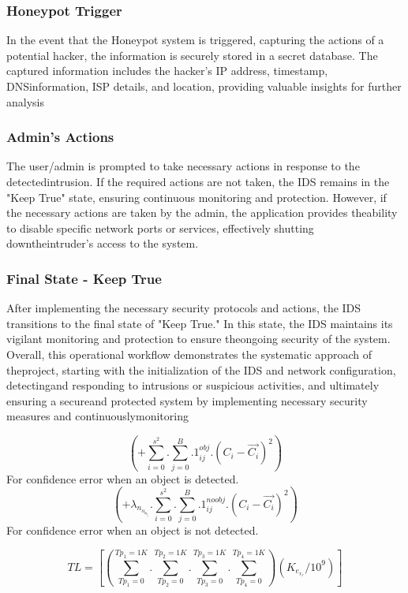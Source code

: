 \documentclass[letterpaper, 10 pt, conference]{ieeeconf}  %
\begin{document}
\subsubsection{Honeypot Trigger}
In the event that the Honeypot system is triggered, capturing the actions of a potential
hacker, the information is securely stored in a secret database. The captured information includes the hacker's IP address, timestamp, DNSinformation, ISP details, and location, providing valuable insights for further analysis

\subsubsection{Admin's Actions}
The user/admin is prompted to take necessary actions in response to the detectedintrusion. If the required actions are not taken, the IDS remains in the "Keep True" state, ensuring continuous monitoring and protection. However, if the necessary actions are taken by the admin, the application provides theability to disable specific network ports or services, effectively shutting downtheintruder's access to the system.

\subsubsection{Final State - Keep True}
After implementing the necessary security protocols and actions, the IDS transitions
to the final state of "Keep True."
In this state, the IDS maintains its vigilant monitoring and protection to ensure theongoing security of the system. Overall, this operational workflow demonstrates the systematic approach of theproject, starting with the initialization of the IDS and network configuration, detectingand responding to intrusions or suspicious activities, and ultimately ensuring a secureand protected system by implementing necessary security measures and continuouslymonitoring 

\begin{equation}
(+ \sum_{i=0}^{s^2} . \sum_{j=0}^{B} .  1_{ij}^{obj} . (C_i - \vec{C_i})^2 )
\end{equation}
For confidence error when an object is detected.
\begin{equation}
(+\lambda_n_o_o_b_j .  \sum_{i=0}^{s^2} . \sum_{j=0}^{B} .  1_{ij}^{noobj} . (C_i - \vec{C_i})^2 )
\end{equation}
For confidence error when an object is not detected.


\begin{equation}
TL = [{(\sum_{Tp_1=0}^{Tp_1=1K} . \sum_{Tp_2=0}^{Tp_2=1K} . \sum_{Tp_3=0}^{Tp_3=1K} . \sum_{Tp_4=0}^{Tp_4=1K}) (K_e_r_r / 10^9)}]
\end{equation}
\end{document}
